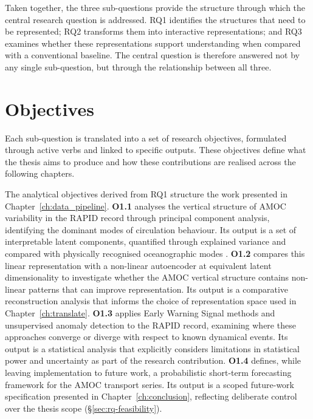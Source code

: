 Taken together, the three sub-questions provide the structure through which the central research question is addressed. RQ1 identifies the structures that need to be represented; RQ2 transforms them into interactive representations; and RQ3 examines whether these representations support understanding when compared with a conventional baseline. The central question is therefore answered not by any single sub-question, but through the relationship between all three.


\section{Objectives}
\label{sec:objectives}

Each sub-question is translated into a set of research objectives, formulated through active verbs and linked to specific outputs. These objectives define what the thesis aims to produce and how these contributions are realised across the following chapters.

The analytical objectives derived from RQ1 structure the work presented in Chapter~\ref{ch:data_pipeline}. \textbf{O1.1} analyses the vertical structure of AMOC variability in the RAPID record through principal component analysis, identifying the dominant modes of circulation behaviour. Its output is a set of interpretable latent components, quantified through explained variance and compared with physically recognised oceanographic modes \citep{buckley2016}. \textbf{O1.2} compares this linear representation with a non-linear autoencoder at equivalent latent dimensionality to investigate whether the AMOC vertical structure contains non-linear patterns that can improve representation. Its output is a comparative reconstruction analysis that informs the choice of representation space used in Chapter~\ref{ch:translate}. \textbf{O1.3} applies Early Warning Signal methods and unsupervised anomaly detection to the RAPID record, examining where these approaches converge or diverge with respect to known dynamical events. Its output is a statistical analysis that explicitly considers limitations in statistical power and uncertainty as part of the research contribution. \textbf{O1.4} defines, while leaving implementation to future work, a probabilistic short-term forecasting framework for the AMOC transport series. Its output is a scoped future-work specification presented in Chapter~\ref{ch:conclusion}, reflecting deliberate control over the thesis scope (\S\ref{sec:rq-feasibility}).

